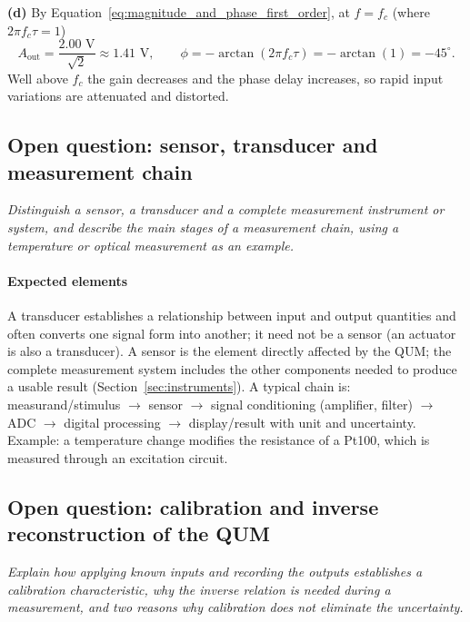 \textbf{(d)} By Equation~\eqref{eq:magnitude_and_phase_first_order}, at $f = f_c$ (where $2\pi f_c\tau = 1$)
\begin{equation*}
A_{\text{out}} = \frac{2.00\text{ V}}{\sqrt{2}} \approx 1.41\text{ V}, \qquad \phi = -\arctan(2\pi f_c\tau) = -\arctan(1) = -45^\circ.
\end{equation*}
Well above $f_c$ the gain decreases and the phase delay increases, so rapid input variations are attenuated and distorted.

\subsection{Open question: sensor, transducer and measurement chain}

\emph{Distinguish a sensor, a transducer and a complete measurement instrument or system, and describe the main stages of a measurement chain, using a temperature or optical measurement as an example.}

\paragraph{Expected elements} A transducer establishes a relationship between input and output quantities and often converts one signal form into another; it need not be a sensor (an actuator is also a transducer). A sensor is the element directly affected by the QUM; the complete measurement system includes the other components needed to produce a usable result (Section~\ref{sec:instruments}). A typical chain is: measurand/stimulus $\to$ sensor $\to$ signal conditioning (amplifier, filter) $\to$ ADC $\to$ digital processing $\to$ display/result with unit and uncertainty. Example: a temperature change modifies the resistance of a Pt100, which is measured through an excitation circuit.

\subsection{Open question: calibration and inverse reconstruction of the QUM}

\emph{Explain how applying known inputs and recording the outputs establishes a calibration characteristic, why the inverse relation is needed during a measurement, and two reasons why calibration does not eliminate the uncertainty.}

